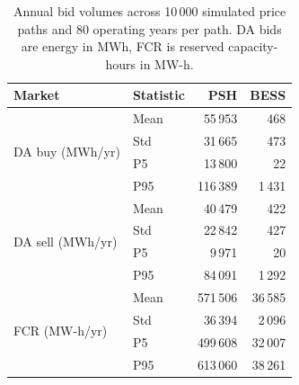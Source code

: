 \begin{table}[ht]
\centering
\caption{Annual bid volumes across 10\,000 simulated price paths and 80 operating years per path. DA bids are energy in MWh, FCR is reserved capacity-hours in MW-h.}
\label{tab:opt-bids}
\begin{tabular}{llrr}
\toprule
Market & Statistic & PSH & BESS \\
\midrule
  \multirow{4}{*}{DA buy (MWh/yr)} & Mean & 55\,953 & 468 \\
   & Std & 31\,665 & 473 \\
   & P5 & 13\,800 & 22 \\
   & P95 & 116\,389 & 1\,431 \\
  \midrule
  \multirow{4}{*}{DA sell (MWh/yr)} & Mean & 40\,479 & 422 \\
   & Std & 22\,842 & 427 \\
   & P5 & 9\,971 & 20 \\
   & P95 & 84\,091 & 1\,292 \\
  \midrule
  \multirow{4}{*}{FCR (MW-h/yr)} & Mean & 571\,506 & 36\,585 \\
   & Std & 36\,394 & 2\,096 \\
   & P5 & 499\,608 & 32\,007 \\
   & P95 & 613\,060 & 38\,261 \\
\bottomrule
\end{tabular}
\end{table}
